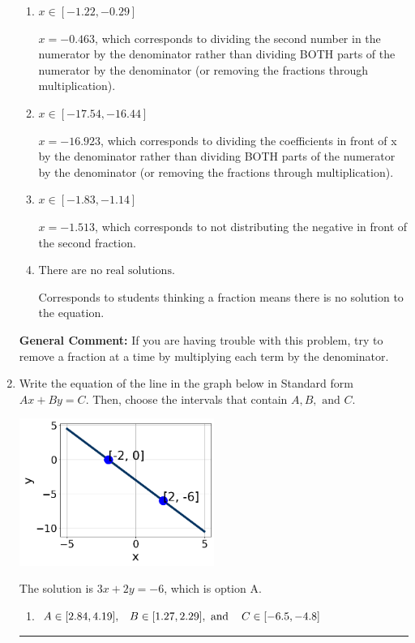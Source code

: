 \documentclass{extbook}[14pt]
\newcommand{\litem}[1]{\item #1

\rule{\textwidth}{0.4pt}}
\begin{document}
\begin{enumerate}
{\begin{enumerate}[label=\Alph*.]
* $x = -3.564$, which is the correct option.
\item \( x \in [-1.22, -0.29] \)

 $x = -0.463$, which corresponds to dividing the second number in the numerator by the denominator rather than dividing BOTH parts of the numerator by the denominator (or removing the fractions through multiplication).
\item \( x \in [-17.54, -16.44] \)

 $x = -16.923$, which corresponds to dividing the coefficients in front of x by the denominator rather than dividing BOTH parts of the numerator by the denominator (or removing the fractions through multiplication).
\item \( x \in [-1.83, -1.14] \)

 $x = -1.513$, which corresponds to not distributing the negative in front of the second fraction.
\item \( \text{There are no real solutions.} \)

Corresponds to students thinking a fraction means there is no solution to the equation.
\end{enumerate}

\textbf{General Comment:} If you are having trouble with this problem, try to remove a fraction at a time by multiplying each term by the denominator.
}
\litem{
Write the equation of the line in the graph below in Standard form $Ax+By=C$. Then, choose the intervals that contain $A, B, \text{ and } C$.

\begin{center}
    \includegraphics[width=0.5\textwidth]{../Figures/linearGraphToStandardB.png}
\end{center}



The solution is \( 3x + 2y = -6 \), which is option A.\begin{enumerate}[label=\Alph*.]
\item \( A \in [2.84, 4.19], \hspace{3mm} B \in [1.27, 2.29], \text{ and } \hspace{3mm} C \in [-6.5, -4.8] \)


\end{enumerate}}
\end{enumerate}
\end{document}
